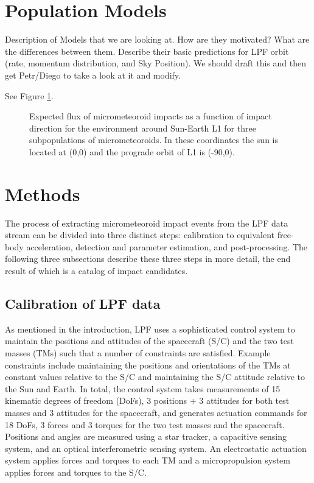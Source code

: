 \documentclass[preprint, trackchanges]{aastex61}
\begin{document}
\FloatBarrier
\section{Population Models}\label{sec:models}
Description of Models that we are looking at.  How are they motivated?  What are the differences between them. Describe their basic predictions for LPF orbit (rate, momentum distribution, and Sky Position). We should draft this and then get Petr/Diego to take a look at it and modify. 


See Figure \ref{fig:models}.

\begin{figure}
\caption{Expected flux of micrometeoroid impacts as a function of impact direction for the environment around Sun-Earth L1 for three subpopulations of micrometeoroids. In these coordinates the sun is located at (0,0) and the prograde orbit of L1 is (-90,0). 
\label{fig:models}}
\end{figure}

\FloatBarrier
\section{Methods} \label{sec:methods}
The process of extracting micrometeoroid impact events from the LPF data stream can be divided into three distinct steps: calibration to equivalent free-body acceleration, detection and parameter estimation, and post-processing.  The following three subsections describe these three steps in more detail, the end result of which is a catalog of impact candidates.


\subsection{Calibration of LPF data}\label{sec:calibration}
As mentioned in the introduction, LPF uses a sophisticated control system to maintain the positions and attitudes of the spacecraft (S/C) and the two test masses (TMs) such that a number of constraints are satisfied.  Example constraints include maintaining the positions and orientations of the TMs at constant values relative to the S/C and maintaining the S/C attitude relative to the Sun and Earth. In total, the control system takes measurements of 15 kinematic degrees of freedom (DoFs), 3 positions + 3 attitudes for both test masses and 3 attitudes for the spacecraft, and generates actuation commands for 18 DoFs, 3 forces and 3 torques for the two test masses and the spacecraft.  Positions and angles are measured using a star tracker, a capacitive sensing system, and an optical interferometric sensing system. An electrostatic actuation system applies forces and torques to each TM and a micropropulsion system applies forces and torques to the S/C. 
\end{document}
